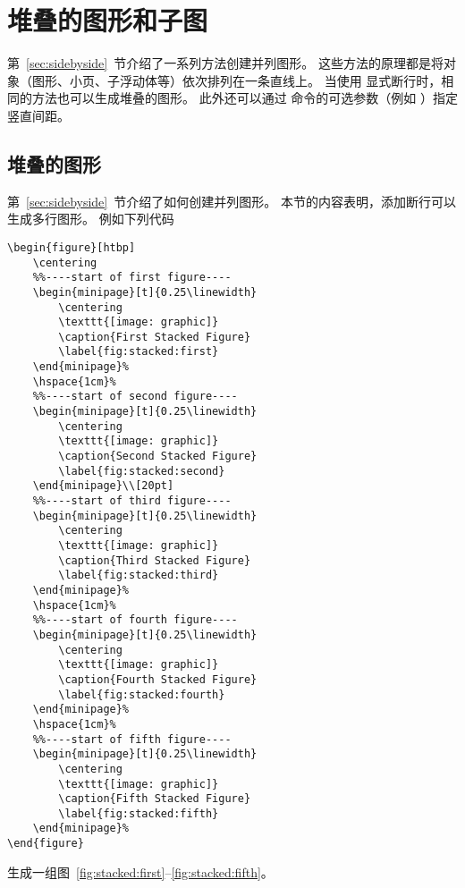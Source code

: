 \section{堆叠的图形和子图}

第~\ref{sec:sidebyside}~节介绍了一系列方法创建并列图形。
这些方法的原理都是将对象（图形、小页、子浮动体等）依次排列在一条直线上。
当使用 \cmd{\cmd{}} 显式断行时，相同的方法也可以生成堆叠的图形。
此外还可以通过 \cmd{\cmd{}} 命令的可选参数（例如 \cmd{\cmd{}}\opt{[20pt]}）指定竖直间距。

\subsection{堆叠的图形}

第~\ref{sec:sidebyside}~节介绍了如何创建并列图形。
本节的内容表明，添加断行可以生成多行图形。
例如下列代码
\begin{lstlisting}
\begin{figure}[htbp]
	\centering
	%%----start of first figure----
	\begin{minipage}[t]{0.25\linewidth}
		\centering
		\texttt{[image: graphic]}
		\caption{First Stacked Figure}
		\label{fig:stacked:first}
	\end{minipage}%
	\hspace{1cm}%
	%%----start of second figure----
	\begin{minipage}[t]{0.25\linewidth}
		\centering
		\texttt{[image: graphic]}
		\caption{Second Stacked Figure}
		\label{fig:stacked:second}
	\end{minipage}\\[20pt]
	%%----start of third figure----
	\begin{minipage}[t]{0.25\linewidth}
		\centering
		\texttt{[image: graphic]}
		\caption{Third Stacked Figure}
		\label{fig:stacked:third}
	\end{minipage}%
	\hspace{1cm}%
	%%----start of fourth figure----
	\begin{minipage}[t]{0.25\linewidth}
		\centering
		\texttt{[image: graphic]}
		\caption{Fourth Stacked Figure}
		\label{fig:stacked:fourth}
	\end{minipage}%
	\hspace{1cm}%
	%%----start of fifth figure----
	\begin{minipage}[t]{0.25\linewidth}
		\centering
		\texttt{[image: graphic]}
		\caption{Fifth Stacked Figure}
		\label{fig:stacked:fifth}
	\end{minipage}%
\end{figure}
\end{lstlisting}
生成一组图~\ref{fig:stacked:first}--\ref{fig:stacked:fifth}。

